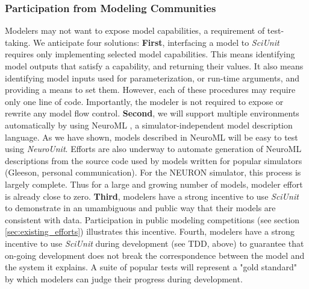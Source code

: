 \documentclass[11pt,letterpaper]{article}
\begin{document}
\subsubsection{Participation from Modeling Communities}
Modelers may not want to expose model capabilities, a requirement of test-taking.  We anticipate four solutions: \textbf{First}, interfacing a model to \textit{SciUnit} requires only implementing selected model capabilities.  This means identifying model outputs that satisfy a capability, and returning their values.  It also means identifying model inputs used for parameterization, or run-time arguments, and providing a means to set them.  However, each of these procedures may require only one line of code.  Importantly, the modeler is not required to expose or rewrite any model flow control.  \textbf{Second}, we will support multiple environments automatically by using NeuroML \cite{gleeson_neuroml:_2010}, a simulator-independent model description language. As we have shown, models described in NeuroML will be easy to test using \textit{NeuroUnit}.  Efforts are also underway to automate generation of NeuroML descriptions from the source code used by models written for popular simulators (Gleeson, personal communication).  For the NEURON simulator, this process is largely complete.  Thus for a large and growing number of models, modeler effort is already close to zero.  \textbf{Third}, modelers have a strong incentive to use \textit{SciUnit} to demonstrate in an umambiguous and public way that their models are consistent with data.  Participation in public modeling competitions (see section \ref{sec:existing_efforts}) illustrates this incentive.  Fourth, modelers have a strong incentive to use \textit{SciUnit} during development (see TDD, above) to guarantee that on-going development does not break the correspondence between the model and the system it explains.  A suite of popular tests will represent a "gold standard" by which modelers can judge their progress during development.
\end{document}
